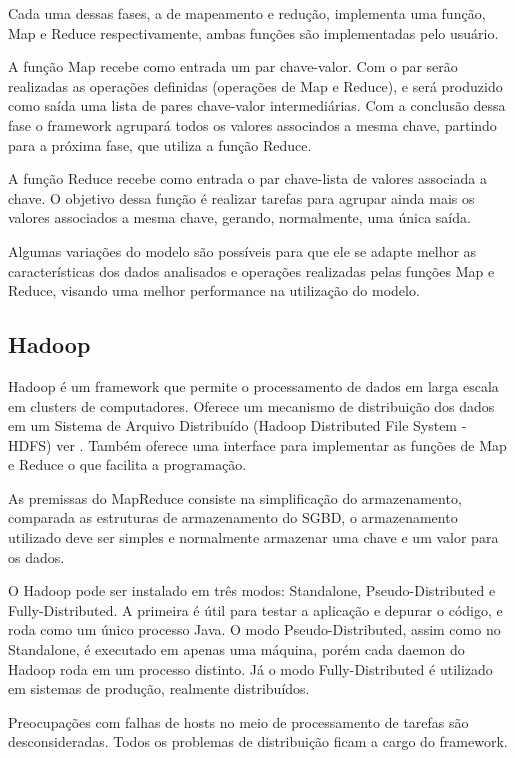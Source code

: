 \documentclass[a4paper,12pt]{article}
\begin{document}
Cada uma dessas fases, a de mapeamento e redução, implementa uma função, Map e 
Reduce respectivamente, ambas funções são implementadas pelo usuário.

A função Map recebe como entrada um par chave-valor. Com o par serão realizadas
as operações definidas (operações de Map e Reduce), e será produzido como saída
uma lista de pares chave-valor intermediárias. Com a conclusão dessa fase o
framework agrupará todos os valores associados a mesma chave, partindo para a
próxima fase, que utiliza a função Reduce.

A função Reduce recebe como entrada o par chave-lista de valores associada a
chave. O objetivo dessa função é realizar tarefas para agrupar ainda mais os
valores associados a mesma chave, gerando, normalmente, uma única saída.

Algumas variações do modelo são possíveis para que ele se adapte melhor as
características dos dados analisados e operações realizadas pelas funções Map e
Reduce, visando uma melhor performance na utilização do modelo. 

\subsection{\textbf{Hadoop}}

Hadoop \cite{hadoop} é um framework que permite o processamento de dados em
larga escala em clusters de computadores. Oferece um mecanismo de distribuição
dos dados em um Sistema de Arquivo Distribuído (Hadoop Distributed File System - HDFS)
ver \cite{hdfs}. Também oferece uma interface para implementar as funções de Map e 
Reduce o que facilita a programação.

As premissas do MapReduce consiste na simplificação do armazenamento, comparada
as estruturas de armazenamento do SGBD, o armazenamento utilizado deve ser
simples e normalmente armazenar uma chave e um valor para os dados.

O Hadoop pode ser instalado em três modos: Standalone, Pseudo-Distributed e
Fully-Distributed. A primeira é útil para testar a aplicação e depurar o código,
e roda como um único processo Java. O modo Pseudo-Distributed, assim como no
Standalone, é executado em apenas uma máquina, porém cada daemon do Hadoop roda
em um processo distinto. Já o modo Fully-Distributed é utilizado em sistemas de
produção, realmente distribuídos.	

Preocupações com falhas de hosts no meio de processamento de tarefas são
desconsideradas. Todos os problemas de distribuição ficam a cargo do framework.
\end{document}
